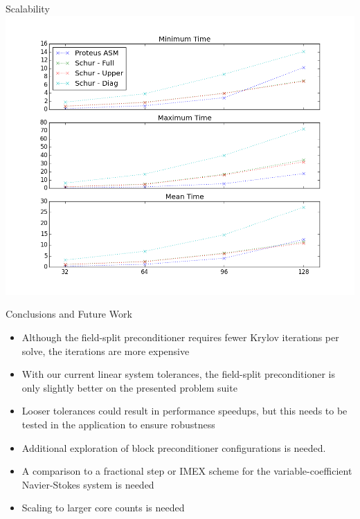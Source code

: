 \documentclass{beamer}
\begin{document}
\begin{frame}{Scalability}
    \includegraphics[width=\textwidth]{figures/marin_time_scalability.png}
\end{frame}

\begin{frame}{Conclusions and Future Work}
  \begin{itemize}
  \item Although the field-split preconditioner requires fewer Krylov
    iterations per solve, the iterations are more expensive
  \item With our current linear system tolerances, the field-split
    preconditioner is only slightly better on the presented problem suite
  \item Looser tolerances could result in performance speedups, but
    this needs to be tested in the application to ensure robustness
  \item Additional exploration of block preconditioner configurations is needed.
  \item A comparison to a fractional step or IMEX scheme for the
    variable-coefficient Navier-Stokes system is needed
  \item Scaling to larger core counts is needed
  \end{itemize}
\end{frame}
\end{document}
